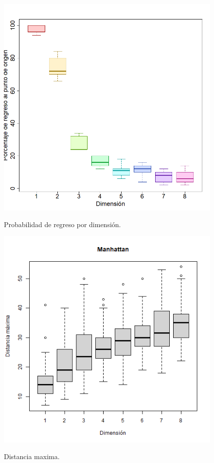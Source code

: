 \documentclass{article}
\begin{document}
\begin{figure}
  \begin{center}
\includegraphics[scale=0.3]{pr1sim.png}
\end{center}
  \caption{Probabilidad de regreso por dimensi\'on.}
  \label{f1}
  \cite{tarea1}

\includegraphics[scale=0.5]{p1mr.png}
 \caption{Distancia maxima.}
  \label{f2}
  \cite{tarea1}
\end{figure}
\end{document}
